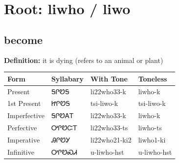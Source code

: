 \documentclass{article}%
\begin{document}
%
\normalsize%
\section*{Root: liwho / liwo}%
\subsection*{become}%
\textbf{Definition: }%
it is dying (refers to an animal or plant)%
\\[0.5em]%
\begin{tabular}{|l|l|l|l|}%
\hline%
\textbf{Form}&\textbf{Syllabary}&\textbf{With Tone}&\textbf{Toneless}\\%
\hline%
Present&ᎦᎵᏬᎦ&li22who33{-}k&liwho{-}k\\%
1st Present&ᏥᎵᏬᎦ&tsi{-}liwo{-}k&tsi{-}liwo{-}k\\%
Imperfective&ᎦᎵᏬᎪᎢ&li22who33{-}k&liwho{-}k\\%
Perfective&ᎤᎵᏬᏨᎢ&li22who33{-}ts&liwho{-}ts\\%
Imperative&ᎯᎵᏬᎩ&li22who21{-}ki2&liwho1{-}ki\\%
Infinitive&ᎤᎵᏬᏍᏗ&u{-}liwho{-}hst&u{-}liwho{-}hst\\%
\hline%
\end{tabular}%
\\[1em]%
\end{document}
